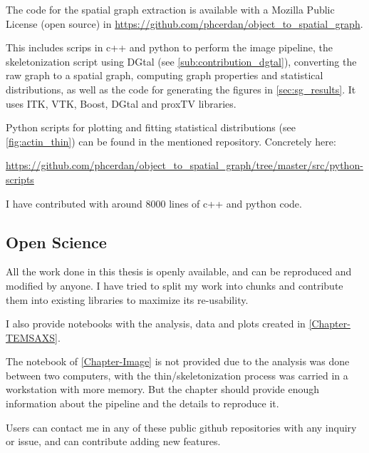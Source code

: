 The code for the spatial graph extraction is available with a Mozilla Public License (open source) in
\url{https://github.com/phcerdan/object_to_spatial_graph}.

This includes scrips in c++ and python to perform the image pipeline, the skeletonization script using DGtal (see \autoref{sub:contribution_dgtal}), converting the raw graph to a spatial graph, computing graph properties and statistical distributions, as well as the code for generating the figures in \autoref{sec:sg_results}. It uses ITK, VTK, Boost, DGtal and proxTV libraries.

Python scripts for plotting and fitting statistical distributions (see \autoref{fig:actin_thin}) can be found in the mentioned repository. Concretely here:

\noindent\url{https://github.com/phcerdan/object_to_spatial_graph/tree/master/src/python-scripts}

I have contributed with around 8000 lines of c++ and python code.

\subsection{Open Science}%
\label{sub:open_science}

All the work done in this thesis is openly available, and can be reproduced and modified by anyone.
I have tried to split my work into chunks and contribute them into existing libraries to maximize its re-usability.

I also provide notebooks with the analysis, data and plots created in \autoref{Chapter-TEMSAXS}.

The notebook of \autoref{Chapter-Image} is not provided due to the analysis was done between two computers, with the thin/skeletonization process was carried in a workstation with more memory.
But the chapter should provide enough information about the pipeline and the details to reproduce it.

Users can contact me in any of these public github repositories with any inquiry or issue, and can contribute adding new features.








